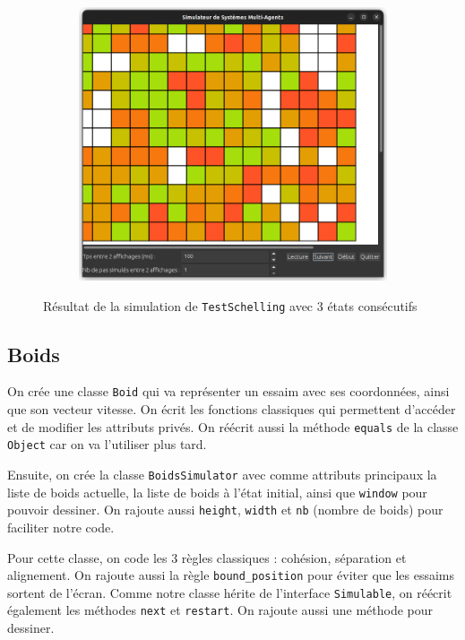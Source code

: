\documentclass[a4paper, 11pt, french]{article}
\begin{document}
\begin{figure}[H]
\begin{subfigure}{0.3\textwidth}
\end{subfigure}
\hfill
\begin{subfigure}{0.3\textwidth}
    \includegraphics[width=\textwidth]{TestSchelling3.png}
\end{subfigure}
\caption{Résultat de la simulation de \texttt{TestSchelling} avec 3 états consécutifs}
\end{figure}

\subsection{Boids}

On crée une classe \verb|Boid| qui va représenter un essaim avec ses coordonnées, ainsi que son vecteur vitesse. On écrit les fonctions classiques qui permettent d'accéder et de modifier les attributs privés. On réécrit aussi la méthode \verb|equals| de la classe \verb|Object| car on va l'utiliser plus tard.

Ensuite, on crée la classe \verb|BoidsSimulator| avec comme attributs principaux la liste de boids actuelle, la liste de boids à l'état initial, ainsi que \verb|window| pour pouvoir dessiner. On rajoute aussi \verb|height|, \verb|width| et \verb|nb| (nombre de boids) pour faciliter notre code. 

Pour cette classe, on code les 3 règles classiques : cohésion, séparation et alignement. On rajoute aussi la règle \verb|bound_position| pour éviter que les essaims sortent de l'écran. Comme notre classe hérite de l'interface \verb|Simulable|, on réécrit également les méthodes \verb|next| et \verb|restart|. On rajoute aussi une méthode pour dessiner.
\end{document}

